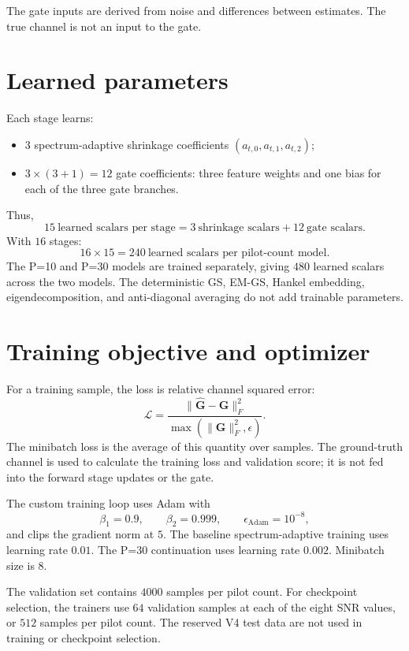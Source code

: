 ﻿\documentclass[11pt,a4paper]{article}
\begin{document}
The gate inputs are derived from noise and differences between estimates.
The true channel is not an input to the gate.

\section{Learned parameters}

Each stage learns:
\begin{itemize}
\item \(3\) spectrum-adaptive shrinkage coefficients
      \((a_{t,0},a_{t,1},a_{t,2})\);
\item \(3\times(3+1)=12\) gate coefficients: three feature weights and
      one bias for each of the three gate branches.
\end{itemize}
Thus,
\begin{equation}
15\ \text{learned scalars per stage}
=
3\ \text{shrinkage scalars}
+
12\ \text{gate scalars}.
\end{equation}
With \(16\) stages:
\[
16\times15=240\ \text{learned scalars per pilot-count model}.
\]
The P=10 and P=30 models are trained separately, giving \(480\) learned
scalars across the two models. The deterministic GS, EM-GS, Hankel
embedding, eigendecomposition, and anti-diagonal averaging do not add
trainable parameters.

\section{Training objective and optimizer}

For a training sample, the loss is relative channel squared error:
\begin{equation}
\mathcal{L}
=
\frac{\|\widehat{\bm{G}}-\bm{G}\|_F^2}
{\max(\|\bm{G}\|_F^2,\epsilon)}.
\end{equation}
The minibatch loss is the average of this quantity over samples. The
ground-truth channel is used to calculate the training loss and validation
score; it is not fed into the forward stage updates or the gate.

The custom training loop uses Adam with
\[
\beta_1=0.9,\qquad \beta_2=0.999,\qquad
\epsilon_{\mathrm{Adam}}=10^{-8},
\]
and clips the gradient norm at \(5\). The baseline spectrum-adaptive
training uses learning rate \(0.01\). The P=30 continuation uses learning
rate \(0.002\). Minibatch size is \(8\).

The validation set contains \(4000\) samples per pilot count. For
checkpoint selection, the trainers use \(64\) validation samples at each
of the eight SNR values, or \(512\) samples per pilot count. The reserved
V4 test data are not used in training or checkpoint selection.
\end{document}
